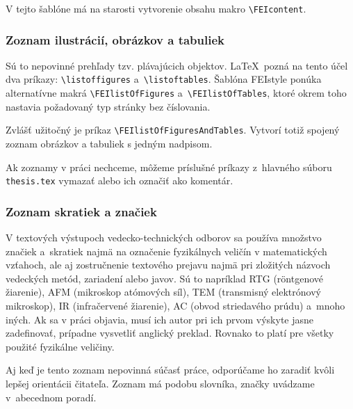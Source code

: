 V tejto šablóne má na starosti vytvorenie obsahu makro \verb|\FEIcontent|.

\subsubsection*{\normalsize Zoznam ilustrácií,
obrázkov a tabuliek}
Sú to nepovinné prehľady tzv. plávajúcich objektov.
\LaTeX\ pozná na tento účel dva príkazy: \verb|\listoffigures| a~\verb|\listoftables|. Šablóna FEIstyle ponúka alternatívne makrá \verb|\FEIlistOfFigures| a~\verb|\FEIlistOfTables|, ktoré okrem toho nastavia požadovaný typ stránky bez číslovania.

Zvlášť užitočný je príkaz \verb|\FEIlistOfFiguresAndTables|.
Vytvorí totiž spojený zoznam obrázkov a tabuliek s jedným nadpisom.

Ak zoznamy v práci nechceme, môžeme príslušné príkazy z~hlavného súboru \verb|thesis.tex| vymazať alebo ich označiť ako komentár.

\subsubsection*{\normalsize Zoznam skratiek a značiek}
V textových výstupoch vedecko-technických odborov sa používa 
množstvo značiek a~skratiek najmä na označenie fyzikálnych 
veličín v matematických vzťahoch,
ale aj zostručnenie textového prejavu najmä pri zložitých názvoch 
vedeckých metód, zariadení alebo javov.
Sú to napríklad RTG (röntgenové žiarenie),
AFM (mikroskop atómových síl),
TEM (transmisný elektrónový mikroskop),
IR (infračervené žiarenie),
AC (obvod striedavého prúdu) a~mnoho iných.
Ak sa v práci objavia, musí ich autor pri ich prvom výskyte
jasne zadefinovať,
prípadne vysvetliť anglický preklad.
Rovnako to platí pre všetky použité fyzikálne veličiny. 

Aj keď je tento zoznam nepovinná súčasť práce,
odporúčame ho zaradiť kvôli lepšej orientácii čitateľa.
Zoznam má podobu slovníka,
značky uvádzame v~abecednom poradí.

